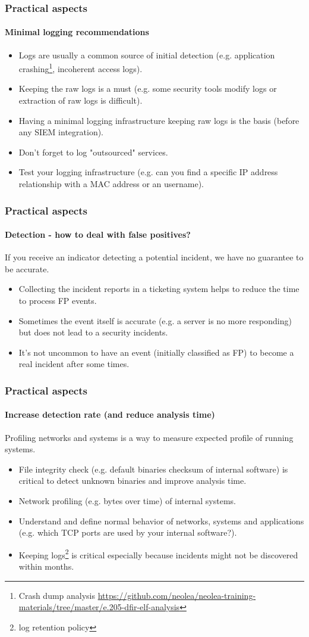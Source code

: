 \begin{frame}[fragile]
\frametitle{Practical aspects}
\framesubtitle{Minimal logging recommendations}
\begin{itemize}
\item Logs are usually a common source of initial detection (e.g. application crashing\footnote{Crash dump analysis \url{https://github.com/neolea/neolea-training-materials/tree/master/e.205-dfir-elf-analysis}}, incoherent access logs).
\item Keeping the raw logs is a must (e.g. some security tools modify logs or extraction of raw logs is difficult).
\item Having a minimal logging infrastructure keeping raw logs is the basis (before any SIEM integration).
\item Don't forget to log "outsourced" services.
\item Test your logging infrastructure (e.g. can you find a specific IP address relationship with a MAC address or an username).
\end{itemize}
\end{frame}


\begin{frame}[fragile]
\frametitle{Practical aspects}
\framesubtitle{Detection - how to deal with false positives?}
If you receive an indicator detecting a potential incident, we have no guarantee to be accurate.
\begin{itemize}
\item Collecting the incident reports in a ticketing system helps to reduce the time to process FP events.
\item Sometimes the event itself is accurate (e.g. a server is no more responding) but does not lead to a security incidents.
\item It's not uncommon to have an event (initially classified as FP) to become a real incident after some times.
\end{itemize}
\end{frame}

\begin{frame}[fragile]
\frametitle{Practical aspects}
\framesubtitle{Increase detection rate (and reduce analysis time)}
Profiling networks and systems is a way to measure expected profile of running systems.
\begin{itemize}
\item File integrity check (e.g. default binaries checksum of internal software) is critical to detect unknown binaries and improve analysis time.
\item Network profiling (e.g. bytes over time) of internal systems.
\item Understand and define normal behavior of networks, systems and applications (e.g. which TCP ports are used by your internal software?).
\item Keeping logs\footnote{log retention policy} is critical especially because incidents might not be discovered within months.
\end{itemize}
\end{frame}

